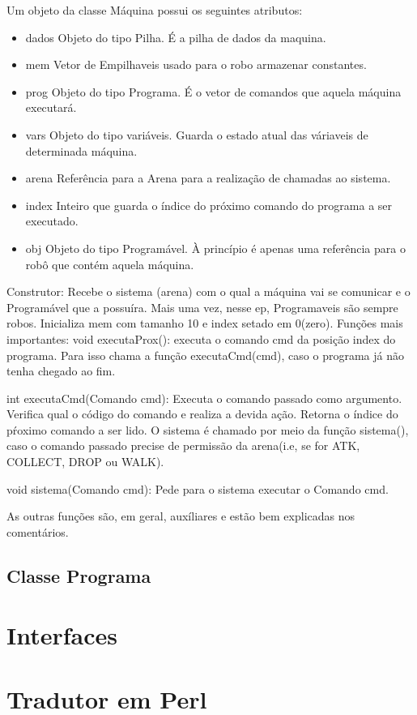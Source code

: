 \documentclass[11pt]{article}
\begin{document}
Um objeto da classe Máquina possui os seguintes atributos:
\begin{itemize}

\item dados
	Objeto do tipo Pilha. É a pilha de dados da maquina.
\item mem
	Vetor de Empilhaveis usado para o robo armazenar constantes.
\item prog
	Objeto do tipo Programa. É o vetor de comandos que aquela máquina executará.
\item vars
	Objeto do tipo variáveis. Guarda o estado atual das váriaveis de determinada máquina.
\item arena
	Referência para a Arena para a realização de chamadas ao sistema.
\item index
	Inteiro que guarda o índice do próximo comando do programa a ser executado.
\item obj
	Objeto do tipo Programável. À princípio é apenas uma referência para o robô que contém aquela máquina.
\end{itemize}

Construtor: Recebe o sistema (arena) com o qual a máquina vai se comunicar e o Programável que a possuíra.
			Mais uma vez, nesse ep, Programaveis são sempre robos. Inicializa mem com tamanho 10 e index setado em 0(zero).
Funções mais importantes:
	void executaProx(): executa o comando cmd da posição index do programa. Para isso chama a função executaCmd(cmd), caso o programa já não tenha chegado ao fim.
	
	int executaCmd(Comando cmd): Executa o comando passado como argumento. Verifica  qual o código do comando e realiza a devida ação.
								 Retorna o índice do pŕoximo comando a ser lido. O sistema é chamado por meio da função sistema(), caso o comando passado precise de permissão da arena(i.e, se for ATK, COLLECT, DROP ou WALK).

	void sistema(Comando cmd):	 Pede para o sistema executar o Comando cmd.

	As outras funções são, em geral, auxíliares e estão bem explicadas nos comentários.

\subsection{Classe Programa}

\section{Interfaces}

\section{Tradutor em Perl}
\end{document}
